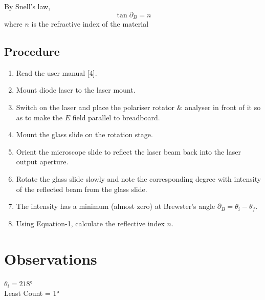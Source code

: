 \documentclass[%
sor,
 jor,
 amsmath,amssymb,
 reprint,
]{revtex4-2}
\begin{document}
By Snell's law, \begin{equation} \tan \partial_B = n
\end{equation}
where $n$ is the refractive index of the material
\subsection{Procedure}
\begin{enumerate}
	\item Read the user manual [4].
	\item Mount diode laser to the laser mount.
	\item Switch on the laser and place the polariser rotator $\&$ analyser in front of it so as to make the $ E $ field parallel to breadboard.
	\item Mount the glass slide on the rotation stage.
	\item Orient the microscope slide to reflect the laser beam back into the laser output aperture.
	\item Rotate the glass slide slowly and note the corresponding degree with intensity of the reflected beam from the glass slide.
	\item The intensity has a  minimum (almost zero) at Brewster's angle $\partial_B = \theta_i - \theta_f$. 
	\item Using Equation-1, calculate the reflective index $n$.
\end{enumerate}

\section{Observations}

\noindent $\theta_i = 218\si{\degree}$ \\
\noindent Least Count = 1\si{\degree}
\end{document}

